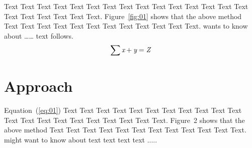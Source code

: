 \documentclass{bioinfo}
\begin{document}
Text Text Text Text Text Text  Text Text Text Text Text Text Text
Text Text  Text Text Text Text Text Text. Figure~\ref{fig:01}
shows that the above method  Text Text Text Text  Text Text Text
Text Text Text  Text Text.  \citep{Bag01} wants to know about
{\ldots}{\ldots} text follows.
\begin{equation}
\sum \text{\it x}+ \text{\it y} =\text{\it Z}\label{eq:01}\vspace*{-10pt}
\end{equation}


\section{Approach}

Equation~(\ref{eq:01}) Text Text Text Text Text Text  Text Text
Text Text Text Text Text Text Text Text Text Text Text Text Text.
Figure~2\vphantom{\ref{fig:02}} shows that the above method  Text
Text Text Text  Text Text Text Text Text Text  Text Text.
\citealp{Boffelli03} might want to know about text text text text
.....
\end{document}
